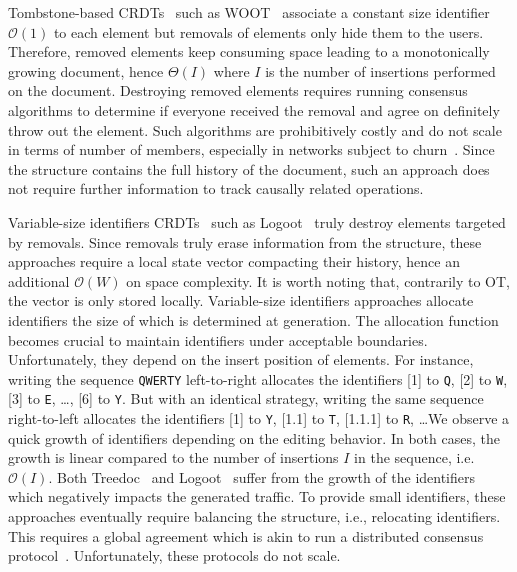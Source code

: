 Tombstone-based CRDTs~\cite{ahmed2011evaluating, conway2014language,
  grishchenko2010deep, oster2006data, roh2011replicated, weiss2007wooki,
  wu2010partial, yu2012stringwise} such as WOOT~\cite{oster2006data} associate a
constant size identifier $\mathcal{O}(1)$ to each element but removals of
elements only hide them to the users. Therefore, removed elements keep consuming
space leading to a monotonically growing document, hence $\Theta(I)$ where $I$
is the number of insertions performed on the document.  Destroying removed
elements requires running consensus algorithms to determine if everyone received
the removal and agree on definitely throw out the element. Such algorithms are
prohibitively costly and do not scale in terms of number of members, especially
in networks subject to churn~\cite{mostefaoui2015signature}. Since the structure
contains the full history of the document, such an approach does not require
further information to track causally related operations.

Variable-size identifiers CRDTs~\cite{nedelec2013lseq, preguica2009commutative,
  weiss2009logoot} such as Logoot~\cite{weiss2009logoot} truly destroy elements
targeted by removals.  Since removals truly erase information from the
structure, these approaches require a local state vector compacting their
history, hence an additional $\mathcal{O}(W)$ on space complexity. It is worth
noting that, contrarily to OT, the vector is only stored locally. Variable-size
identifiers approaches allocate identifiers the size of which is determined at
generation. The allocation function becomes crucial to maintain identifiers
under acceptable boundaries. Unfortunately, they depend on the insert position
of elements. For instance, writing the sequence \texttt{QWERTY} left-to-right
allocates the identifiers [1] to \texttt{Q}, [2] to \texttt{W}, [3] to
\texttt{E}, \ldots, [6] to \texttt{Y}. But with an identical strategy, writing
the same sequence right-to-left allocates the identifiers [1] to \texttt{Y},
[1.1] to \texttt{T}, [1.1.1] to \texttt{R}, \ldots We observe a quick growth of
identifiers depending on the editing behavior. In both cases, the growth is
linear compared to the number of insertions $I$ in the sequence,
i.e. $\mathcal{O}(I)$. Both Treedoc~\cite{preguica2009commutative} and
Logoot~\cite{weiss2009logoot, weiss2010logootundo} suffer from the growth of the
identifiers which negatively impacts the generated traffic.
To provide small identifiers, these approaches eventually require balancing the
structure, i.e., relocating identifiers. This requires a global agreement which is
akin to run a distributed consensus
protocol~\cite{zawirski2011asynchronous}. Unfortunately, these protocols do not
scale.

